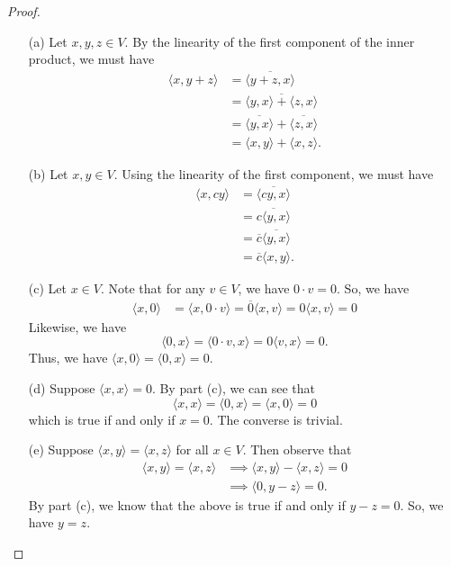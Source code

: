 \begin{proof}
\begin{enumerate}
    \item[(a)] Let \( x,y,z \in V  \). By the linearity of the first component of the inner product, we must have
        \begin{align*}
            \langle x, y  + z  \rangle &= \overline{\langle y + z , x  \rangle} \\ 
                                       &= \overline{\langle y, x  \rangle + \langle  z, x  \rangle}  \\ 
                                       &=  \overline{\langle y,x \rangle} + \overline{\langle z,x \rangle} \\
                                       &= \langle x,y \rangle + \langle x,z \rangle.
        \end{align*}
    \item[(b)] Let \( x,y \in V  \). Using the linearity of the first component, we must have 
        \begin{align*}
            \langle x, cy \rangle &= \overline{\langle cy, x  \rangle} \\
                                  &= \overline{c \langle y,x \rangle} \\ 
                                  &= \overline{c} \overline{\langle y,x \rangle} \\
                                  &= \overline{c} \langle  x,y  \rangle.
        \end{align*}
    \item[(c)] Let \( x \in V  \). Note that for any \( v \in V   \), we have \( 0 \cdot v = 0  \). So, we have
        \begin{align*}
            \langle x,0 \rangle &= \langle x, 0 \cdot v  \rangle = \overline{0} \langle x , v  \rangle  = 0 \langle x, v  \rangle = 0  
        \end{align*}
        Likewise, we have
        \[  \langle 0,x  \rangle = \langle  0 \cdot v , x  \rangle =  0 \langle v , x  \rangle = 0. \]
        Thus, we have \( \langle x,0  \rangle = \langle 0, x  \rangle = 0  \).
    \item[(d)] Suppose \( \langle x,x \rangle = 0  \). By part (c), we can see that 
        \[  \langle x , x \rangle = \langle 0  , x  \rangle = \langle x , 0  \rangle = 0    \]
        which is true if and only if \( x = 0  \). The converse is trivial.
    \item[(e)] Suppose \( \langle x , y \rangle = \langle x , z \rangle  \) for all \( x \in V  \). Then observe that 
        \begin{align*}
            \langle x , y \rangle  = \langle x , z \rangle &\implies \langle x , y \rangle - \langle x , z \rangle = 0   \\
                                                           &\implies \langle 0  ,  y -z  \rangle = 0.
        \end{align*}
        By part (c), we know that the above is true if and only if \( y - z = 0  \). So, we have \( y = z  \).
\end{enumerate}
\end{proof}

